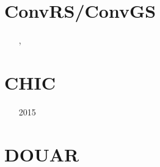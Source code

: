 \section{ConvRS/ConvGS} 

\begin{small}
\begin{itemize}
\item[\twothousandeight] \textcite{yosh08}
\item[\twothousandnine] \textcite{yona09}
\item[\twothousandtwelve] \textcite{yoth12}, \textcite{yosh12}
\item[\twothousandthirteen] \textcite{yosh13}
\item[\twothousandtwenty] \textcite{yosy20}
\item[\twothousandtwentythree] \textcite{yosh23}
\end{itemize}
\end{small} 


\section{CHIC}  

\begin{small}
\begin{itemize}
\item[2015] \textcite{norv15}
\end{itemize}
\end{small}


\section{DOUAR}

